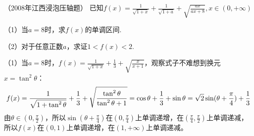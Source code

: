 \newpage
\begin{example}{（2008年江西浸泡压轴题）}{}
    已知$\displaystyle f \left( x \right)= \frac{1}{ \sqrt{1+x}}+ \frac{1}{ \sqrt{1+a}}+ \sqrt{ \frac{ax}{ax+8}},x \in \left( 0,+ \infty \right)$
\vspace{5pt}

    （1）当$a=8$时，求$f(x)$的单调区间.

    （2）对于任意正数$a$，求证$1<f(x)<2$.
\end{example}
\begin{solution}
    （1）当$a=8$时，$\displaystyle f(x)= \frac{1}{ \sqrt{1+x}}+ \frac{1}{3}+ \sqrt{ \frac{x}{x+1}}$，观察式子不难想到换元$x=\tan^2\theta$：
    \[f(x)=\frac{1}{ \sqrt{1+\tan^2\theta}}+ \frac{1}{3}+ \sqrt{ \frac{\tan^2\theta}{\tan^2\theta+1}}\\=\cos \theta+ \frac{1}{3}+ \sin \theta\\=\sqrt{2}\sin(\theta+\frac{\pi}{4})+\frac13\]
    由$\theta\in(0,\frac{\pi}{2})$，所以$\sin(\theta+\frac{\pi}{4})$在$(0,\frac{\pi}{4})$上单调递增，在$(\frac{\pi}{4},\frac{\pi}{2})$上单调递减，所以$f(x)$在$(0,1)$上单调递增，在$(1,+\infty)$上单调递减。


\end{solution}
